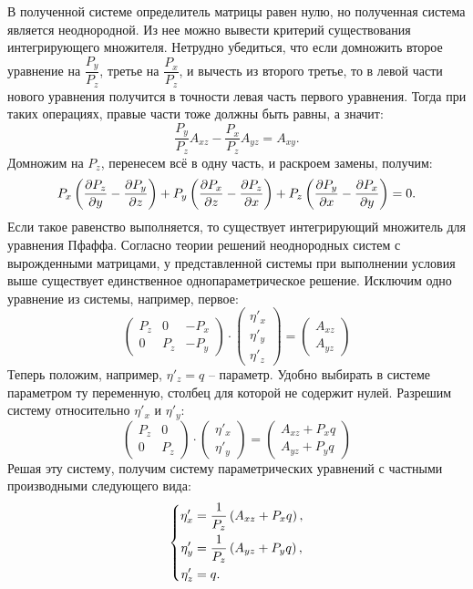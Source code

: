 	В полученной системе определитель матрицы равен нулю, но полученная система является неоднородной. Из нее можно вывести критерий существования интегрирующего множителя. Нетрудно убедиться, что если домножить второе уравнение на $\dfrac{P_y}{P_z}$, третье на $\dfrac{P_x}{P_z}$, и вычесть из второго третье, то в левой части нового уравнения получится в точности левая часть первого уравнения. Тогда при таких операциях, правые части тоже должны быть равны, а значит:
	\[ \frac{P_y}{P_z} A_{xz} - \frac{P_x}{P_z} A_{yz} = A_{xy}. \]
	Домножим на $P_z$, перенесем всё в одну часть, и раскроем замены, получим:
	\[ P_x \left( \dfrac{\partial P_z}{\partial y} - \dfrac{\partial P_y}{\partial z} \right) + P_y \left( \dfrac{\partial P_x}{\partial z} - \dfrac{\partial P_z}{\partial x} \right) + P_z \left( \dfrac{\partial P_y}{\partial x} - \dfrac{\partial P_x}{\partial y} \right) = 0. \]
	Если такое равенство выполняется, то существует интегрирующий множитель для уравнения Пфаффа. Согласно теории решений неоднородных систем с вырожденными матрицами, у представленной системы при выполнении условия выше существует единственное однопараметрическое решение. Исключим одно уравнение из системы, например, первое:
	\[ \begin{pmatrix}
		P_z & 0 & - P_x \\
		0 & P_z & - P_y
	\end{pmatrix} \cdot \begin{pmatrix}
		\eta'_x \\ \eta'_y \\ \eta'_z
	\end{pmatrix} = \begin{pmatrix}
		A_{xz} \\ A_{yz}
	\end{pmatrix} \]
	Теперь положим, например, $\eta'_{z} = q$ -- параметр. Удобно выбирать в системе параметром ту переменную, столбец для которой не содержит нулей. Разрешим систему относительно $\eta'_{x}$ и $\eta'_{y}$:
	\[ \begin{pmatrix}
		P_z & 0 \\
		0 & P_z
	\end{pmatrix} \cdot \begin{pmatrix}
		\eta'_x \\ \eta'_y
	\end{pmatrix} = \begin{pmatrix}
		A_{xz} + P_x q \\ A_{yz} + P_y q
	\end{pmatrix} \]
	Решая эту систему, получим систему параметрических уравнений с частными производными следующего вида:
	\[ \left\lbrace \begin{split} 
		\eta'_x &= \frac{1}{P_z} \left( A_{xz} + P_x q \right), \\
		\eta'_y &= \frac{1}{P_z} \left( A_{yz} + P_y q \right), \\
		\eta'_z &= q.
	\end{split} \right. \]
